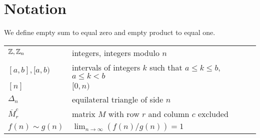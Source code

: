 \chapter*{Notation}

\bigskip

We define empty sum to equal zero and empty product to equal one.
\bigskip

\noindent
 \begin{tabularx}{\linewidth}{l X}
 $\mathbb Z, \mathbb Z_n$ & integers, integers modulo $n$ \\
 $[a,b], [a,b)$ & intervals of integers $k$ such that $a \leq k \leq b$, $a \leq k < b$ \\
 $[n]$ & $[0,n)$ \\
 $\Delta_n$ & equilateral triangle of side $n$ \\
 $\overbar{M}_r^c$ & matrix $M$ with row $r$ and column $c$ excluded \\
 $f(n) \sim g(n)$ & $\lim_{n \rightarrow \infty} (f(n)/g(n)) = 1$ \\
 \end{tabularx}